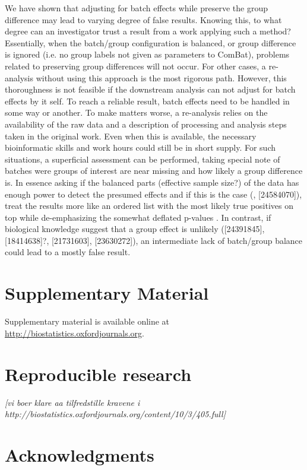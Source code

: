 \documentclass{bio}
\newcommand\NB[1]{\textcolor{NBcol}{\textit{#1}}} %
\newcommand\NOTE[1]{\NB{[#1]}} %
\newcommand\CITE[1]{\textcolor{CITEcol}{[#1]}} %
\begin{document}
We have shown that adjusting for batch effects while preserve the group difference may lead to varying degree of false results. Knowing this, to what degree can an investigator trust a result from a work applying such a method? Essentially, when the batch/group configuration is balanced, or group difference is ignored  (i.e. no group labels not given as parameters to ComBat), problems related to preserving group differences will not occur. For other cases, a re-analysis without using this approach is the most rigorous path. However, this thoroughness is not feasible if the downstream  analysis can not adjust for batch effects by it self. To reach a reliable result, batch effects need to be handled in some way or another. To make matters worse, a re-analysis relies on the availability of the raw data and a description of processing and analysis steps taken in the original work. Even when this is available, the necessary bioinformatic skills and work hours could still be in short supply. For such situations, a superficial assessment can be performed, taking special note of batches were groups of interest are near missing and how likely a group difference is. In essence asking if the balanced parts (effective sample size?) of the data has enough power to detect the presumed effects and if this is the case (\citealp{Johnson2007}, \CITE{24584070}), treat the results more like an ordered list with the most likely true positives on top while de-emphasizing the somewhat deflated p-values . In contrast, if biological knowledge suggest that a group effect is unlikely  (\CITE{24391845}, \CITE{18414638}?, \CITE{21731603}, \CITE{23630272}), an intermediate lack of batch/group balance  could lead to a mostly false result.


\section{Supplementary Material}
\label{supp}

Supplementary material is available online at
\href{http://biostatistics.oxfordjournals.org}%
{http://biostatistics.oxfordjournals.org}.

\section*{Reproducible research}
\NOTE{vi boer klare aa tilfredstille kravene i http://biostatistics.oxfordjournals.org/content/10/3/405.full}


\section*{Acknowledgments}
\end{document}
